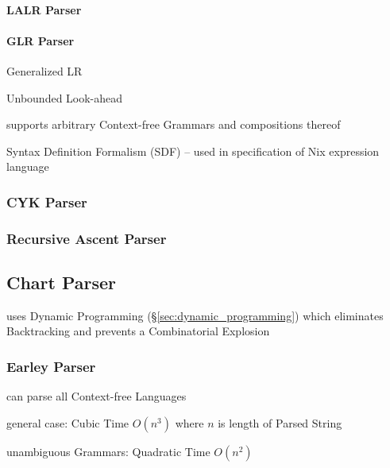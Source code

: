 \paragraph{LALR Parser}\label{sec:lalr_parser}\hfill

\paragraph{GLR Parser}\label{sec:glr_parser}\hfill

Generalized LR

Unbounded Look-ahead

supports arbitrary Context-free Grammars and compositions thereof

Syntax Definition Formalism (SDF) -- used in specification of Nix expression
language



\subsubsection{CYK Parser}\label{sec:cyk_parser}

\subsubsection{Recursive Ascent Parser}\label{sec:recursive_ascent}



\subsection{Chart Parser}\label{sec:chart_parser}

uses Dynamic Programming (\S\ref{sec:dynamic_programming}) which eliminates
Backtracking and prevents a Combinatorial Explosion



\subsubsection{Earley Parser}\label{sec:earley_parser}

can parse all Context-free Languages

general case: Cubic Time $O(n^3)$ where $n$ is length of Parsed String

unambiguous Grammars: Quadratic Time $O(n^2)$

